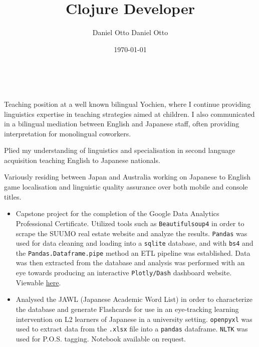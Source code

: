 \documentclass[10pt,a4paper,ragged2e,withhyper]{altacv}
\author{Daniel Otto Daniel Otto}
\date{\today}
\title{Clojure Developer}
\begin{document}

\makecvheader

​\begin{paracol}{2}

\label{sec:org54471f9}
Teaching position at a well known bilingual Yochien, where I continue providing linguistics expertise in teaching strategies aimed at children. I also communicated in a bilingual mediation between English and Japanese staff, often providing interpretation for monolingual coworkers.
\par\divider
{}
Plied my understanding of linguistics and specialisation in second language acquisition teaching English to Japanese nationals.
\par\divider
{}
Variously residing between Japan and Australia working on Japanese to English game localisation and linguistic quality assurance over both mobile and console titles.

\label{sec:orgdd43776}

\begin{itemize}
\item Capstone project for the completion of the Google Data Analytics Professional Certificate. Utilized tools such as \texttt{Beautifulsoup4} in order to scrape the SUUMO real estate website and analyze the results. \texttt{Pandas} was used for data cleaning and loading into a \texttt{sqlite} database, and with \texttt{bs4} and the \texttt{Pandas.Dataframe.pipe} method an ETL pipeline was established. Data was then extracted from the database and analysis was performed with an eye towards producing an interactive \texttt{Plotly/Dash} dashboard website. Viewable \href{https://github.com/nanjigen/tokyo-rentals-analysis}{here}.
\end{itemize}
\begin{itemize}
\item Analysed the JAWL (Japanese Academic Word List) in order to characterize the database and generate Flashcards for use in an eye-tracking learning intervention on L2 learners of Japanese in a university setting. \texttt{openpyxl} was used to extract data from the \texttt{.xlsx} file into a \texttt{pandas} dataframe. \texttt{NLTK} was used for P.O.S. tagging. Notebook available on request.
\end{itemize}


\end{paracol}
\end{document}
